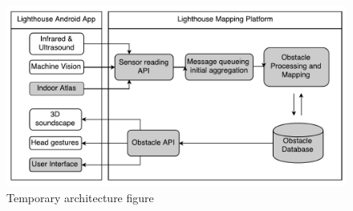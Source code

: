 \documentclass[prodmode,acmtosem]{acmsmall} %
\begin{document}
\begin{figure}
\label{fig:architecture}
\centering
\includegraphics[width=\textwidth]{ReportDiagram.pdf}
\caption{Temporary architecture figure}
\end{figure}

\end{document}
